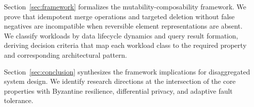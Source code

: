 Section~\ref{sec:framework} formalizes the mutability-composability framework. We prove that idempotent merge operations and targeted deletion without false negatives are incompatible when reversible element representations are absent. We classify workloads by data lifecycle dynamics and query result formation, deriving decision criteria that map each workload class to the required property and corresponding architectural pattern.

Section~\ref{sec:conclusion} synthesizes the framework implications for disaggregated system design. We identify research directions at the intersection of the core properties with Byzantine resilience, differential privacy, and adaptive fault tolerance.
